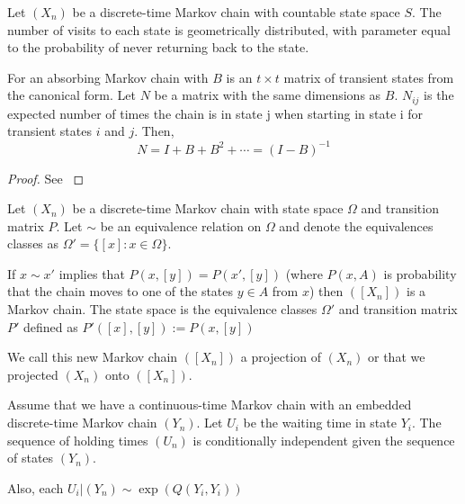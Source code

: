\begin{theorem}\label{thm:visits_geom}
Let $(X_n)$ be a discrete-time Markov chain with countable state space $S$.
The number of visits to each state is geometrically distributed, with parameter equal to the probability of never returning back to the state.
\end{theorem}

\begin{theorem} \label{thm:fund_exp} \cite{grinstead2003}
For an absorbing Markov chain with $B$ is an $t \times t$ matrix of transient states from the canonical form. Let $N$ be a matrix with the same dimensions as $B$. $N_{ij}$ is the expected number of times the chain is in state j when starting in state i for transient states $i$ and $j$. Then,
\begin{equation}
    N = I + B + B^2 + \cdots = (I - B)^{-1}
\end{equation}
\end{theorem}

\begin{proof}
See \cite{grinstead2003}
\end{proof}

\begin{theorem}\label{thm:mc_projection} \cite{LevinPeresWilmer2006}
Let $(X_n)$ be a discrete-time Markov chain with state space $\Omega$ and transition matrix $P$.
Let $\sim$ be an equivalence relation on $\Omega$ and denote the equivalences classes as $\Omega' = \{[x]: x \in \Omega\}$.

If $x \sim x'$ implies that $P(x,[y]) = P(x', [y])$ (where $P(x,A)$ is probability that the chain moves to one of the states $y \in A$ from $x$) then $([X_n])$  is a Markov chain.
The state space is the equivalence classes $\Omega'$ and transition matrix $P'$ defined as $P'([x],[y]) := P(x, [y])$

We call this new Markov chain $([X_n])$ a projection of $(X_n)$ or that we projected $(X_n)$ onto $([X_n])$.
\end{theorem}

\begin{theorem}\label{thm:x_N_indep}
Assume that we have a continuous-time Markov chain with an embedded discrete-time Markov chain $(Y_n)$.
Let $U_i$ be the waiting time in state $Y_i$.
The sequence of holding times $(U_n)$ is conditionally independent given the sequence of states $(Y_n)$.

Also, each $U_i | (Y_n) \sim \exp(Q(Y_i,Y_i))$
\end{theorem}

